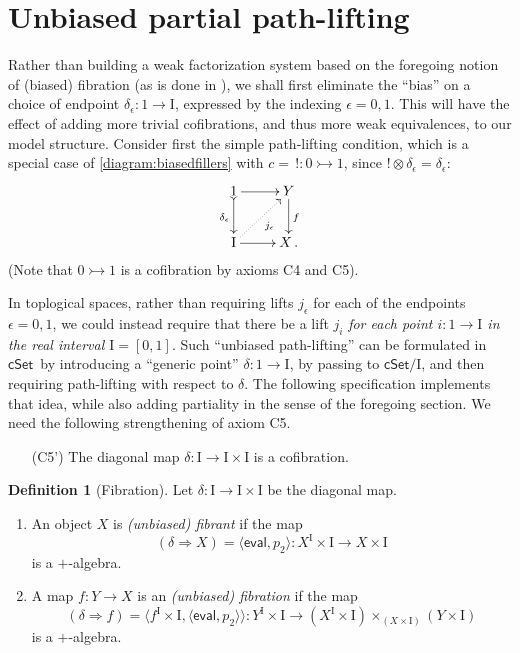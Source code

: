 \documentclass[11pt]{article}
\newcommand{\cSet}{\ensuremath{\mathsf{cSet}}}
\newcommand{\mono}{\ensuremath{\rightarrowtail}}
\newcommand{\ra}{\ensuremath{\rightarrow}}
\newcommand{\I}{\ensuremath{\mathrm{I}}}
\theoremstyle{remark}
\theoremstyle{definition}
\newtheorem{definition}[theorem]{Definition}
\begin{document}
\section{Unbiased partial path-lifting}\label{sec:unbiasedfibration}

Rather than building a weak factorization system based on the foregoing notion of (biased) fibration (as is done in \cite{GG,OP}), we shall first eliminate the ``bias'' on a choice of endpoint $\delta_\epsilon : 1 \to \I$, expressed by the indexing $\epsilon = 0,1$.  This will have the effect of adding more trivial cofibrations, and thus more weak equivalences, to our model structure. Consider first the simple path-lifting condition, which is a special case of \eqref{diagram:biasedfillers} with $c =\, ! : 0\mono 1$, since $!\otimes\delta_\epsilon = \delta_\epsilon$:
\begin{equation*}
\xymatrix{
1 \ar@{>->}[d]_{\delta_\epsilon} \ar[r] & Y \ar[d]^f \\
\I \ar@{.>}[ru]_{j_\epsilon} \ar[r] & X\,.
}
\end{equation*}
(Note that $0\mono 1$ is a cofibration by axioms C4 and C5).

In toplogical spaces, rather than requiring lifts $j_\epsilon$ for each of the endpoints $\epsilon = 0,1$, we could instead require that there be a lift $j_i$ \emph{for each point $i: 1\to\I$ in the real interval $\I = [0,1]$}. Such ``unbiased path-lifting'' can be formulated in \cSet\ by introducing a ``generic point'' $\delta : 1\to \I$, by passing to $\cSet/\I$, and then requiring path-lifting with respect to $\delta$.  The following specification implements that  idea, while also adding partiality in the sense of the foregoing section.  We need the following strengthening of axiom C5.

\begin{enumerate}
\item[(C5')] The diagonal map $\delta : \I\to\I\times\I$ is a cofibration.  
\end{enumerate}

\begin{definition}[Fibration]\label{def:unbiasedfibration}
Let $\delta : \I\to\I\times\I$ be the diagonal map.
\begin{enumerate}
\item An object $X$ is \emph{(unbiased) fibrant} if the map 
\[
(\delta\Rightarrow\! X) = \langle\mathsf{eval}, p_2\rangle : X^\I \times \I \to X\times \I
\]
is a $+$-algebra. 
\item A map $f : Y\ra X$ is an \emph{(unbiased) fibration} if the map 
\[
(\delta\Rightarrow\! f) = \langle f^\I\times \I, \langle \mathsf{eval},p_2 \rangle\rangle: Y^\I\times \I \to (X^\I \times \I)\times_{(X\times \I)} (Y\times\I)
\]
is a $+$-algebra.
\end{enumerate}
\end{definition}
\end{document}
